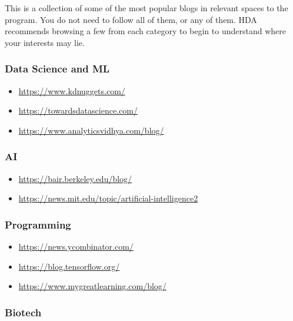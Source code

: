 \documentclass[
]{book}
\providecommand{\tightlist}{%
  \setlength{\itemsep}{0pt}\setlength{\parskip}{0pt}}
\begin{document}
This is a collection of some of the most popular blogs in relevant spaces to the program. You do not need to follow all of them, or any of them. HDA recommends browsing a few from each category to begin to understand where your interests may lie.

\subsubsection*{Data Science and ML}\label{data-science-and-ml}

\begin{itemize}
\tightlist
\item
  \url{https://www.kdnuggets.com/}
\item
  \url{https://towardsdatascience.com/}
\item
  \url{https://www.analyticsvidhya.com/blog/}
\end{itemize}

\subsubsection*{AI}\label{ai}

\begin{itemize}
\tightlist
\item
  \url{https://bair.berkeley.edu/blog/}
\item
  \url{https://news.mit.edu/topic/artificial-intelligence2}
\end{itemize}

\subsubsection*{Programming}\label{programming-1}

\begin{itemize}
\tightlist
\item
  \url{https://news.ycombinator.com/}
\item
  \url{https://blog.tensorflow.org/}
\item
  \url{https://www.mygreatlearning.com/blog/}
\end{itemize}

\subsubsection*{Biotech}\label{biotech}
\end{document}
